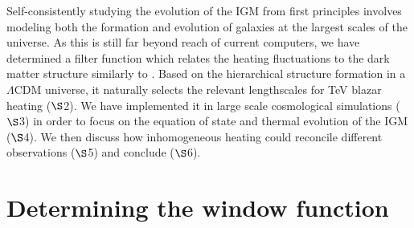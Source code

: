 \documentclass[twocolumns]{emulateapj}
\begin{document}
Self-consistently studying the evolution of the IGM from first principles involves modeling both the formation and evolution of galaxies  at the largest scales of the universe. As this is still far beyond reach of current computers, we have determined a filter function which relates the heating fluctuations to the dark matter structure similarly to \citet{2007MNRAS.376.1680P,2005ApJ...626....1B,2014PhRvD..89h3010P}. Based on the hierarchical structure formation in a $\Lambda$CDM universe, it naturally selects the relevant lengthscales for TeV blazar heating ($\S$2). We have implemented it in large scale cosmological simulations ($\S$3) in order to  focus on the equation of state and thermal evolution of the  IGM ($\S$4). We then discuss how inhomogeneous heating could reconcile different observations ($\S$5)  and conclude ($\S$6).















\section {Determining the window function}\label{window}
\end{document}
